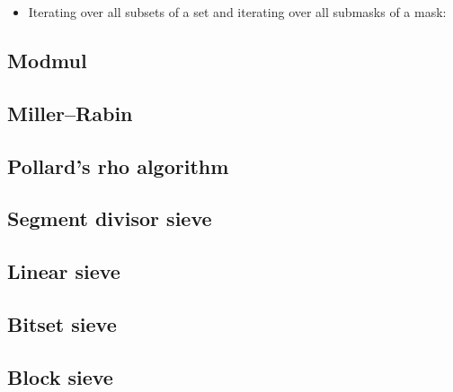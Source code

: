 \begin{itemize}
  \item Iterating over all subsets of a set and iterating over all submasks of a mask:
\end{itemize}

\subsection{Modmul}

\subsection{Miller–Rabin}

\subsection{Pollard's rho algorithm}

\subsection{Segment divisor sieve}

\subsection{Linear sieve}

\subsection{Bitset sieve}

\subsection{Block sieve}
